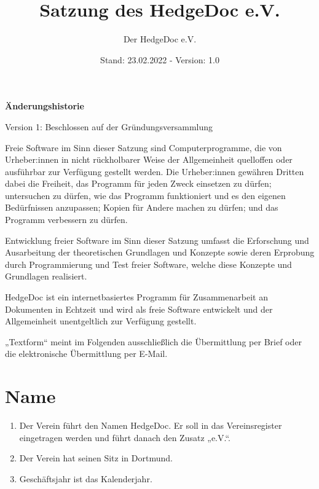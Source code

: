 \documentclass[12pt,paper=a4,ngerman]{scrreprt}
\author{Der HedgeDoc e.V.}
\title{Satzung des HedgeDoc e.V.}
\date{Stand: 23.02.2022 - Version: 1.0}
\begin{document}
	\maketitle
	\newpage
	
	\textbf{Änderungshistorie}
	\begin{description}
		\item
			Version 1: Beschlossen auf der Gründungsversammlung
	\end{description}
	\newpage
	
	\tableofcontents
	\newpage
	
        Freie Software im Sinn dieser Satzung sind Computerprogramme, die von Urheber:innen in nicht rückholbarer Weise der Allgemeinheit quelloffen oder ausführbar zur Verfügung gestellt werden. Die Urheber:innen gewähren Dritten dabei die Freiheit, das Programm für jeden Zweck einsetzen zu dürfen; untersuchen zu dürfen, wie das Programm funktioniert und es den eigenen Bedürfnissen anzupassen; Kopien für Andere machen zu dürfen; und das Programm verbessern zu dürfen.
        
        Entwicklung freier Software im Sinn dieser Satzung umfasst die Erforschung und Ausarbeitung der theoretischen Grundlagen und Konzepte sowie deren Erprobung durch Programmierung und Test freier Software, welche diese Konzepte und Grundlagen realisiert.
        
        HedgeDoc ist ein internetbasiertes Programm für Zusammenarbeit an Dokumenten in Echtzeit und wird als freie Software entwickelt und der Allgemeinheit unentgeltlich zur Verfügung gestellt.
        
        „Textform“ meint im Folgenden ausschließlich die Übermittlung per Brief oder die elektronische Übermittlung per E-Mail.
    
	\section{Name}
	\begin{enumerate}
		\item
			Der Verein führt den Namen HedgeDoc. Er soll in das Vereinsregister eingetragen werden und führt danach den Zusatz „e.V.“.
		\item
			Der Verein hat seinen Sitz in Dortmund.
		\item
			Geschäftsjahr ist das Kalenderjahr.
	\end{enumerate}
	
\end{document}
